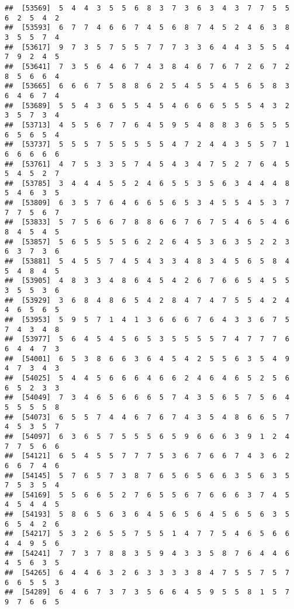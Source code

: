 \documentclass[
]{book}
\begin{document}
\begin{verbatim}
##  [53569]  5  4  4  3  5  5  6  8  3  7  3  6  3  4  3  7  7  5  5  6  2  5  4  2
##  [53593]  6  7  7  4  6  6  7  4  5  6  8  7  4  5  2  4  6  3  8  3  5  5  7  4
##  [53617]  9  7  3  5  7  5  5  7  7  7  3  3  6  4  4  3  5  5  4  7  9  2  4  5
##  [53641]  7  3  5  6  4  6  7  4  3  8  4  6  7  6  7  2  6  7  2  8  5  6  6  4
##  [53665]  6  6  6  7  5  8  8  6  2  5  4  5  5  4  5  6  5  8  3  6  4  6  7  4
##  [53689]  5  5  4  3  6  5  5  4  5  4  6  6  6  5  5  5  4  3  2  3  5  7  3  4
##  [53713]  4  5  5  6  7  7  6  4  5  9  5  4  8  8  3  6  5  5  5  6  5  6  5  4
##  [53737]  5  5  5  7  5  5  5  5  5  4  7  2  4  4  3  5  5  7  1  6  6  6  6  6
##  [53761]  4  7  5  3  3  5  7  4  5  4  3  4  7  5  2  7  6  4  5  5  4  5  2  7
##  [53785]  3  4  4  4  5  5  2  4  6  5  5  3  5  6  3  4  4  4  8  5  4  6  3  5
##  [53809]  6  3  5  7  6  4  6  6  5  6  5  3  4  5  5  4  5  3  7  7  7  5  6  7
##  [53833]  5  7  5  6  6  7  8  8  6  6  7  6  7  5  4  6  5  4  6  8  4  5  4  5
##  [53857]  5  6  5  5  5  5  6  2  2  6  4  5  3  6  3  5  2  2  3  6  3  7  3  6
##  [53881]  5  4  5  5  7  4  5  4  3  3  4  8  3  4  5  6  5  8  4  5  4  8  4  5
##  [53905]  4  8  3  3  4  8  6  4  5  4  2  6  7  6  6  5  4  5  5  3  5  5  3  6
##  [53929]  3  6  8  4  8  6  5  4  2  8  4  7  4  7  5  5  4  2  4  4  6  5  6  5
##  [53953]  5  9  5  7  1  4  1  3  6  6  6  7  6  4  3  3  6  7  5  7  4  3  4  8
##  [53977]  5  6  4  5  4  5  6  5  3  5  5  5  5  7  4  7  7  7  6  6  4  4  7  3
##  [54001]  6  5  3  8  6  6  3  6  4  5  4  2  5  5  6  3  5  4  9  4  7  3  4  3
##  [54025]  5  4  4  5  6  6  6  4  6  6  2  4  6  4  6  5  2  5  6  6  5  2  3  3
##  [54049]  7  3  4  6  5  6  6  6  5  7  4  3  5  6  5  7  5  6  4  5  5  5  5  8
##  [54073]  6  5  5  7  4  4  6  7  6  7  4  3  5  4  8  6  6  5  7  4  5  3  5  7
##  [54097]  6  3  6  5  7  5  5  5  6  5  9  6  6  6  3  9  1  2  4  7  7  5  6  6
##  [54121]  6  5  4  5  5  7  7  7  5  3  6  7  6  6  7  4  3  6  2  6  6  7  4  6
##  [54145]  5  7  6  5  7  3  8  7  6  5  6  5  6  6  3  5  6  3  5  7  5  3  5  4
##  [54169]  5  5  6  6  5  2  7  6  5  5  6  7  6  6  6  3  7  4  5  4  5  4  4  5
##  [54193]  5  8  6  5  6  3  6  4  5  6  5  6  4  5  6  5  6  3  5  6  5  4  2  6
##  [54217]  5  3  2  6  5  5  7  5  5  1  4  7  7  5  4  6  5  6  6  4  4  9  5  6
##  [54241]  7  7  3  7  8  8  3  5  9  4  3  3  5  8  7  6  4  4  6  4  5  6  3  5
##  [54265]  6  4  4  6  3  2  6  3  3  3  3  8  4  7  5  5  7  5  7  6  6  5  5  3
##  [54289]  6  4  6  7  3  7  3  5  6  6  4  5  9  5  5  8  1  5  7  9  7  6  6  5

\end{verbatim}
\end{document}
